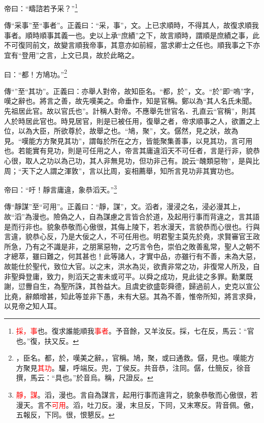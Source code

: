 帝曰：“疇諮若予采？”\footnote{\textcolor{red}{採，事}也。復求誰能順我\textcolor{red}{事者}。予音餘，又羊汝反。採，七在反，馬云：“官也。”復，扶又反。}

{\noindent\zhuan{}\fzbyks 傳“采事”至“事者”。正義曰：“采，事”，文。上已求順時，不得其人，故復求順我事者。順時順事其義一也。史以上承“庶績”之下，故言順時，謂順是庶績之事，此不可復同前文，故變言順我帝事，其意亦如前經，當求卿士之任也。順我事之下亦宜有“登用”之言，上文已具，故於此略之。 \par}

曰：“都！方鳩功。”\footnote{\textcolor{red}{}，臣名。都，於，嘆美之辭。，官稱。鳩，聚，或曰通救。僝，見也。嘆能方方聚見\textcolor{red}{其功}。驩，呼端反。兜，丁侯反。共音恭，注同。僝，仕簡反，徐音撰，馬云：“具也。”於音烏。稱，尺證反。}

{\noindent\zhuan{}\fzbyks 傳“”至“其功”。正義曰：亦舉人對帝，故知臣名。“都，於”，文。“於”即“嗚”字，嘆之辭也。將言之善，故先嘆美之。命垂作，知是官稱。鄭以為“其人名氏未聞。先祖居此官。故以官氏也”。計稱人對帝。不應舉先世官名．孔直云“官稱”，則其人於時居此官也。時見居官，則是已被任用，復舉之者，帝求順事之人，欲置之上位，以為大臣，所欲尊於，故舉之也。“鳩，聚”，文。僝然，見之狀，故為見。“嘆能方方聚見其功”，謂每於所在之方，皆能聚集善事，以見其功，言可用也。若能實有見功，則是可任用之人，帝言其庸違滔天不可任者，言是行非，貌恭心很，取人之功以為己功，其人非無見功，但功非己有。說云“醜類惡物”，是與比周；“天下之人謂之渾敦”，言以比周，妄相薦舉，知所言見功非其實功也。 \par}

帝曰：“吁！靜言庸違，象恭滔天。”\footnote{\textcolor{red}{靜，謀}。滔，漫也。言自為謀言，起用行事而違背之，貌象恭敬而心傲很，若漫天。言不\textcolor{red}{可用}。滔，吐刀反。漫，末旦反，下同，又末寒反。背音佩。傲，五報反，下同。很，恨懇反。}

{\noindent\zhuan{}\fzbyks 傳“靜謀”至“可用”。正義曰：“靜，謀”，文。滔者，漫浸之名，浸必漫其上，故“滔”為漫也。險偽之人，自為謀慮之言皆合於道，及起用行事而背違之，言其語是而行非也。貌象恭敬而心傲很，其侮上陵下，若水漫天，言貌恭而心很也。行與言違，貌恭心反，乃是大佞之人，不可任用也。明君聖主莫先於堯，求賢審官王政所急，乃有之不識是非，之朋黨惡物，之巧言令色，崇伯之敗善亂常，聖人之朝不才總萃，雖曰難之，何其甚也！此等諸人，才實中品，亦雖行有不善，未為大惡，故能仕於聖代，致位大官。以之末，洪水為災，欲責非常之功，非復常人所及，自非聖舜登庸，致力，則滔天之害未或可平。以舜之成功，見此徒之多罪。勳業既謝，愆釁自生，為聖所誅，其咎益大。且虞史欲盛彰舜德，歸過前人，史克以宣公比堯，辭頗增甚，知此等並非下愚，未有大惡。其為不善，惟帝所知，將言求舜，以見帝之知人耳。 \par}

